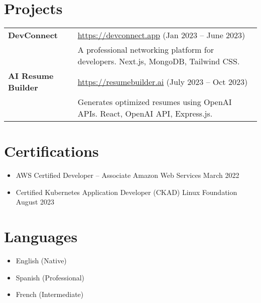 \documentclass{article}
\newcommand{\cvsection}[1]{\section*{\textbf{#1}}}
\begin{document}
\cvsection{Projects}
\begin{tabularx}{\textwidth}{lX}
    \textbf{DevConnect} & \href{https://devconnect.app}{https://devconnect.app} \hfill (Jan 2023 -- June 2023) \\
    & A professional networking platform for developers.  Next.js, MongoDB, Tailwind CSS. \\
    \textbf{AI Resume Builder} & \href{https://resumebuilder.ai}{https://resumebuilder.ai} \hfill (July 2023 -- Oct 2023) \\
    & Generates optimized resumes using OpenAI APIs. React, OpenAI API, Express.js. \\
\end{tabularx}


\cvsection{Certifications}
\begin{itemize}
    \item AWS Certified Developer – Associate \hfill Amazon Web Services \hfill March 2022
    \item Certified Kubernetes Application Developer (CKAD) \hfill Linux Foundation \hfill August 2023
\end{itemize}

\cvsection{Languages}
\begin{itemize}
    \item English (Native)
    \item Spanish (Professional)
    \item French (Intermediate)
\end{itemize}
\end{document}
